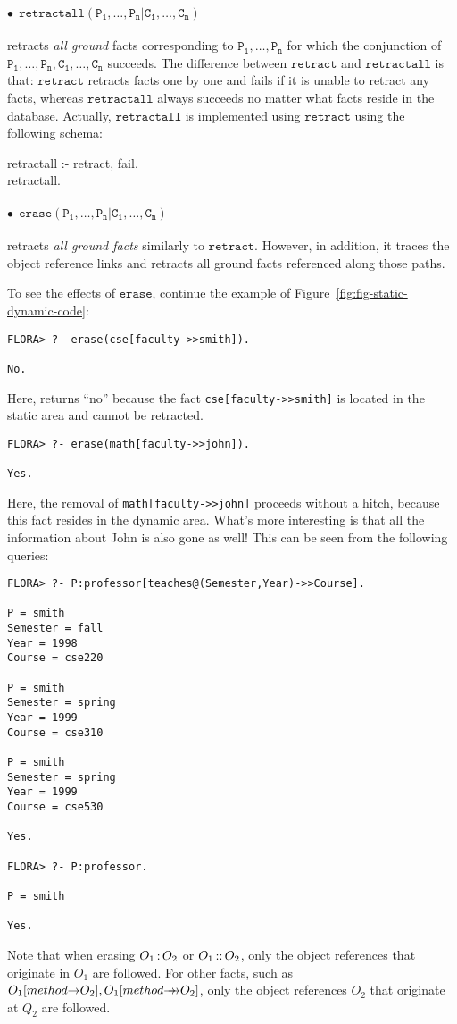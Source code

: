 \documentclass[11pt]{report}
\begin{document}
\paragraph{$\bullet~~\mathtt{retractall(P_1,\ldots,P_n | C_1,\ldots,C_n)}$} retracts \emph{all ground}
facts corresponding to $\mathtt{P_1,\ldots,P_n}$ for which the conjunction
of $\mathtt{P_1,\ldots,P_n,C_1,\ldots,C_n}$ succeeds. The difference
between $\mathtt{retract}$ and $\mathtt{retractall}$ is that:
$\mathtt{retract}$ retracts facts one by one and fails if it is unable to
retract any facts, whereas $\mathtt{retractall}$ always succeeds no matter
what facts reside in the database. Actually, $\mathtt{retractall}$ is
implemented using $\mathtt{retract}$ using the following schema:
\begin{qrules}
retractall :- retract, fail. \\
retractall.
\end{qrules}

\paragraph{$\bullet~~\mathtt{erase(P_1,\ldots,P_n | C_1,\ldots,C_n)}$}
retracts \emph{all ground facts} 
similarly to $\mathtt{retract}$. However, in addition, it traces the object
reference links and retracts all ground facts referenced along those paths.

To see the effects of $\mathtt{erase}$, continue
the example of Figure~\ref{fig:fig-static-dynamic-code}:
\begin{verbatim}
FLORA> ?- erase(cse[faculty->>smith]).

No.
\end{verbatim}
Here, \FLORA returns ``no'' because the fact {\tt cse[faculty->>smith]} is
located in the static area and cannot be retracted.

\begin{verbatim}
FLORA> ?- erase(math[faculty->>john]).

Yes.
\end{verbatim}
Here, the removal of {\tt math[faculty->>john]} proceeds without a hitch,
because this fact resides in the dynamic area. What's more interesting is
that all the information about John is also gone as well!
This can be seen from the following queries:
\begin{verbatim}
FLORA> ?- P:professor[teaches@(Semester,Year)->>Course].

P = smith
Semester = fall
Year = 1998
Course = cse220

P = smith
Semester = spring
Year = 1999
Course = cse310

P = smith
Semester = spring
Year = 1999
Course = cse530

Yes.

FLORA> ?- P:professor.

P = smith

Yes.
\end{verbatim}
Note that when erasing $O_1{\,{\bf{:}}\,}O_2$ or $O_1{\,{\bf{::}}\,}O_2$, only the object
references that originate in $O_1$ are followed. For other \fl facts, such as
$O_1[method{{\rightarrow}}O_2],O_1[method{{\rightarrow\!\!\!\!\rightarrow}}O_2]$, only the object references
$O_2$ that originate at $Q_2$ are followed.
\end{document}
